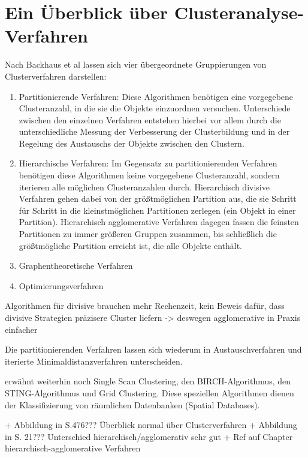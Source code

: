 \chapter{Ein Überblick über Clusteranalyse-Verfahren}

Nach Backhaus et al \cite{Backhaus.2016} lassen sich vier übergeordnete Gruppierungen von Clusterverfahren darstellen:

\begin{enumerate}
	\item Partitionierende Verfahren: Diese Algorithmen benötigen eine vorgegebene Clusteranzahl, in die sie die Objekte einzuordnen versuchen. Unterschiede zwischen den einzelnen Verfahren entstehen hierbei vor allem durch die unterschiedliche Messung der Verbesserung der Clusterbildung und in der Regelung des Austauschs der Objekte zwischen den Clustern.
	\item Hierarchische Verfahren: Im Gegensatz zu partitionierenden Verfahren benötigen diese Algorithmen keine vorgegebene Clusteranzahl, sondern iterieren alle möglichen Clusteranzahlen durch. Hierarchisch divisive Verfahren gehen dabei von der größtmöglichen Partition aus, die sie Schritt für Schritt in die kleinstmöglichen Partitionen zerlegen (ein Objekt in einer Partition). Hierarchisch agglomerative Verfahren dagegen fassen die feinsten Partitionen zu immer größeren Gruppen zusammen, bis schließlich die größtmögliche Partition erreicht ist, die alle Objekte enthält.
	\item Graphentheoretische Verfahren
	\item Optimierungsverfahren
\end{enumerate}

\cite{Pedrycz.2010} Algorithmen für divisive brauchen mehr Rechenzeit, kein Beweis dafür, dass divisive Strategien präzisere Cluster liefern -> deswegen agglomerative in Praxis einfacher

Die partitionierenden Verfahren lassen sich wiederum in Austauschverfahren und iterierte Minimaldistanzverfahren unterscheiden.

\cite{Xu.1999} erwähnt weiterhin noch Single Scan Clustering, den BIRCH-Algorithmus, den STING-Algorithmus und Grid Clustering. Diese speziellen Algorithmen dienen der Klassifizierung von räumlichen Datenbanken (Spatial Databases).

+ Abbildung in \cite{Backhaus.2016} S.476??? Überblick normal über Clusterverfahren
+ Abbildung in \cite{Xu.1999} S. 21??? Unterschied hierarchisch/agglomerativ sehr gut
+ Ref auf Chapter hierarchisch-agglomerative Verfahren